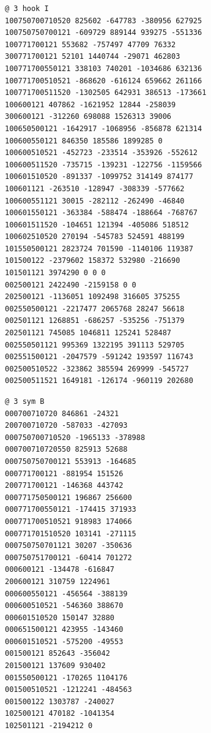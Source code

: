 \begin{Verbatim}[fontsize=\footnotesize]
@ 3 hook I
100750700710520 825602 -647783 -380956 627925
100750750700121 -609729 889144 939275 -551336
100771700121 553682 -757497 47709 76332
300771700121 52101 1440744 -29071 462803
100771700550121 338103 740201 -1034686 632136
100771700510521 -868620 -616124 659662 261166
100771700511520 -1302505 642931 386513 -173661
100600121 407862 -1621952 12844 -258039
300600121 -312260 698088 1526313 39006
100650500121 -1642917 -1068956 -856878 621314
100600550121 846350 185586 1899285 0
100600510521 -452723 -233514 -353926 -552612
100600511520 -735715 -139231 -122756 -1159566
100601510520 -891337 -1099752 314149 874177
100601121 -263510 -128947 -308339 -577662
100600551121 30015 -282112 -262490 -46840
100601550121 -363384 -588474 -188664 -768767
100601511520 -104651 121394 -405086 518512
100602510520 270194 -545783 524591 488199
101550500121 2823724 701590 -1140106 119387
101500122 -2379602 158372 532980 -216690
101501121 3974290 0 0 0
002500121 2422490 -2159158 0 0
202500121 -1136051 1092498 316605 375255
002550500121 -2217477 2065768 28247 56618
002501121 1268851 -686257 -535256 -751379
202501121 745085 1046811 125241 528487
002550501121 995369 1322195 391113 529705
002551500121 -2047579 -591242 193597 116743
002500510522 -323862 385594 269999 -545727
002500511521 1649181 -126174 -960119 202680
\end{Verbatim}
\begin{Verbatim}[fontsize=\footnotesize]
@ 3 sym B
000700710720 846861 -24321
200700710720 -587033 -427093
000750700710520 -1965133 -378988
000700710720550 825913 52688
000750750700121 553913 -164685
000771700121 -881954 151526
200771700121 -146368 443742
000771750500121 196867 256600
000771700550121 -174415 371933
000771700510521 918983 174066
000771701510520 103141 -271115
000750750701121 30207 -350636
000750751700121 -60414 701272
000600121 -134478 -616847
200600121 310759 1224961
000600550121 -456564 -388139
000600510521 -546360 388670
000601510520 150147 32880
000651500121 423955 -143460
000601510521 -575200 -49553
001500121 852643 -356042
201500121 137609 930402
001550500121 -170265 1104176
001500510521 -1212241 -484563
001500122 1303787 -240027
102500121 470182 -1041354
102501121 -2194212 0
\end{Verbatim}
